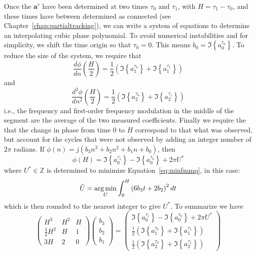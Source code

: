 Once the $\boldsymbol{a}^{\tau}$ have been determined
at two times $\tau_{0}$ and $\tau_{1}$, with $H = \tau_{1} - \tau_{0}$, and these
times have between determined as connected (see
Chapter~\ref{chap:partialtracking}), we can write a system of equations
to determine an interpolating cubic phase polynomial. To avoid numerical
instabilities and for simplicity, we shift the time origin so that $\tau_{0} =
0$. This means $b_0 = \Im \left\{ a^{\tau_0}_{0} \right\}$. To reduce the size
of the system, we require that 
\[
    \frac{d \phi}{d n} \left(\frac{H}{2} \right)
    =
    \frac{1}{2}
    \left( \Im \left\{ a^{\tau_0}_{1} \right\} + \Im \left\{ a^{\tau_1}_{1}
    \right\} \right)
\]
and
\[
    \frac{d^{2} \phi}{d n^{2}} \left(\frac{H}{2}
    \right)
    =
    \frac{1}{2} \left( \Im \left\{ a^{\tau_0}_{2} \right\} + \Im \left\{
    a^{\tau_1}_{2} \right\} \right)
\]
i.e., the frequency and first-order frequency modulation in the middle of the
segment are the average of the two measured coefficients. Finally we require the
that the change in phase from time $0$ to $H$ correspond to that what was
observed, but account for the cycles that were not observed by adding an integer
number of $2\pi$ radians. If $\phi(n)=j(b_3 n^{3} + b_2 n^{2} + b_1 n + b_0)$,
then
\[
    \phi \left( H \right)
    =
    \Im \left\{ a^{\tau_1}_{0} \right\} - \Im \left\{ a^{\tau_0}_{0} \right\}
    + 2 \pi U^{\ast}
\]
where $U^{\ast} \in \mathbb{Z}$ is determined to minimize
Equation~\ref{eq:minfmmq}, in this case:
\begin{equation}
    \label{eq:minfmcubic}
    \tilde{U} = \mathop{\rm arg\,min}_{U} \int_{0}^{H} \left(
    6 b_3 t + 2 b_2 \right)^{2} dt
\end{equation}
which is then rounded to the nearest integer to give $U^{\ast}$. To summarize we have
\begin{equation}
    \begin{pmatrix}
        H^{3} & H^{2} & H \\
        \frac{3}{4}H^{2} & H & 1 \\
        3 H & 2 & 0
    \end{pmatrix}
    \begin{pmatrix}
        b_{3} \\
        b_{2} \\
        b_{1}
    \end{pmatrix}
    =
    \begin{pmatrix}
        \Im \left\{ a^{\tau_1}_{0} \right\} - \Im \left\{ a^{\tau_0}_{0} \right\}
            + 2 \pi U^{\ast} \\
        \frac{1}{2}
        \left( \Im \left\{ a^{\tau_0}_{1} \right\} + \Im \left\{ a^{\tau_1}_{1}
        \right\} \right) \\
        \frac{1}{2} \left( \Im \left\{ a^{\tau_0}_{2} \right\} + \Im \left\{
        a^{\tau_1}_{2} \right\} \right)
    \end{pmatrix}
\end{equation}
